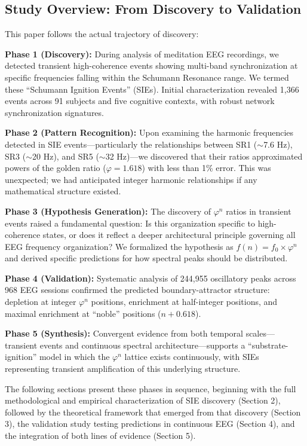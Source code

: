 \documentclass[11pt,a4paper]{article}
\newcommand{\phisym}{\varphi}
\begin{document}
\subsection{Study Overview: From Discovery to Validation}

This paper follows the actual trajectory of discovery:

\textbf{Phase 1 (Discovery):} During analysis of meditation EEG recordings, we detected transient high-coherence events showing multi-band synchronization at specific frequencies falling within the Schumann Resonance range. We termed these ``Schumann Ignition Events'' (SIEs). Initial characterization revealed 1,366 events across 91 subjects and five cognitive contexts, with robust network synchronization signatures.

\textbf{Phase 2 (Pattern Recognition):} Upon examining the harmonic frequencies detected in SIE events---particularly the relationships between SR1 ($\sim$7.6 Hz), SR3 ($\sim$20 Hz), and SR5 ($\sim$32 Hz)---we discovered that their ratios approximated powers of the golden ratio ($\phisym = 1.618$) with less than 1\% error. This was unexpected; we had anticipated integer harmonic relationships if any mathematical structure existed.

\textbf{Phase 3 (Hypothesis Generation):} The discovery of $\phisym^n$ ratios in transient events raised a fundamental question: Is this organization specific to high-coherence states, or does it reflect a deeper architectural principle governing all EEG frequency organization? We formalized the hypothesis as $f(n) = f_0 \times \phisym^n$ and derived specific predictions for how spectral peaks should be distributed.

\textbf{Phase 4 (Validation):} Systematic analysis of 244,955 oscillatory peaks across 968 EEG sessions confirmed the predicted boundary-attractor structure: depletion at integer $\phisym^n$ positions, enrichment at half-integer positions, and maximal enrichment at ``noble'' positions ($n + 0.618$).

\textbf{Phase 5 (Synthesis):} Convergent evidence from both temporal scales---transient events and continuous spectral architecture---supports a ``substrate-ignition'' model in which the $\phisym^n$ lattice exists continuously, with SIEs representing transient amplification of this underlying structure.

The following sections present these phases in sequence, beginning with the full methodological and empirical characterization of SIE discovery (Section 2), followed by the theoretical framework that emerged from that discovery (Section 3), the validation study testing predictions in continuous EEG (Section 4), and the integration of both lines of evidence (Section 5).
\end{document}
